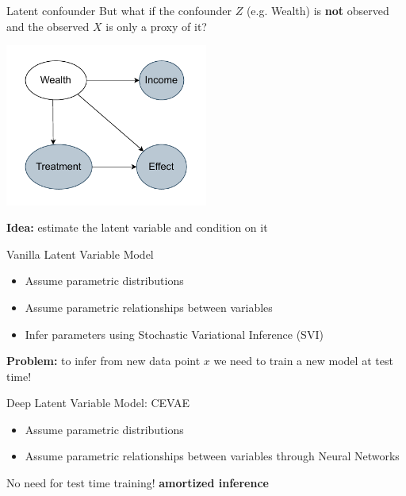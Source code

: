 \documentclass[10pt]{beamer}
\begin{document}
\begin{frame}{Latent confounder}
But what if the confounder $Z$ (e.g. Wealth) is \textbf{not} observed and the observed $X$ is only a proxy of it?
    \begin{center}
  \includegraphics[width=0.5\textwidth]{images/latent_confounder.pdf}
\end{center}
  
\textbf{Idea:} estimate the latent variable and condition on it

 \end{frame}

 \begin{frame}{Vanilla Latent Variable Model}
     \begin{itemize}
         \item Assume parametric distributions
         \item Assume parametric relationships between variables
         \begin{equation*}
           
         \end{equation*}
         \item Infer parameters using Stochastic Variational Inference (SVI)
     \end{itemize}

     \textbf{Problem:} to infer from new data point $x$ we need to train a new model at test time! 
 \end{frame}

  \begin{frame}{Deep Latent Variable Model: CEVAE}
     \begin{itemize}
         \item Assume parametric distributions
         \item Assume parametric relationships between variables through \alert{Neural Networks}
     \end{itemize}
    No need for test time training! \textbf{amortized inference}

 \end{frame}
\end{document}

